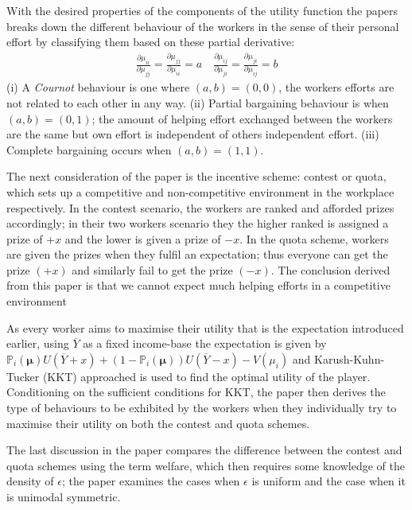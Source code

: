 \documentclass[a4paper,10pt,leqno]{article}
\theoremstyle{definition}
\begin{document}
With the desired properties of the components of the utility function the papers breaks down the different behaviour of the workers in the sense of their personal effort by classifying them based on these partial derivative:
\begin{align*}
\frac{\partial\mu_{ii}}{\partial\mu_{jj}}=\frac{\partial\mu_{jj}}{\partial\mu_{ii}}=a\quad
\frac{\partial\mu_{ij}}{\partial\mu_{ji}}=\frac{\partial\mu_{ji}}{\partial\mu_{ij}}=b
\end{align*}
(i) A \emph{Cournot} behaviour is one where $(a,b)=(0,0)$, the workers efforts are not related to each other in any way. (ii) Partial bargaining behaviour is when $(a,b)=(0,1)$; the amount of helping effort exchanged between the workers are the same but own effort is independent of others independent effort. (iii) Complete bargaining occurs when $(a,b)=(1,1)$.


The next consideration of the paper is the incentive scheme: contest or quota, which sets up a competitive and non-competitive environment in the workplace respectively. In the contest scenario, the workers are ranked and afforded prizes accordingly; in their two workers scenario they the higher ranked is assigned a prize of $+x$ and the lower is given a prize of $-x$. In the quota scheme, workers are given the prizes when they fulfil an expectation; thus everyone can get the prize $(+x)$ and similarly fail to get the prize $(-x)$. The conclusion derived from this paper is that we cannot expect much helping efforts in a competitive environment 

As every worker aims to maximise their utility that is the expectation introduced earlier, using $\overline{Y}$ as a fixed income-base the expectation is given by $\mathbb{P}_i(\mathbf{\mu})U(\overline{Y}+x)+(1-\mathbb{P}_i(\mathbf{\mu}))U(\overline{Y}-x)-V(\mu_i)$
and Karush-Kuhn-Tucker (KKT) approached is used to find the optimal utility of the player. Conditioning on the sufficient conditions for KKT, the paper then derives the type of behaviours to be exhibited by the workers when they individually try to maximise their utility on both the contest and quota schemes.

The last discussion in the paper compares the difference between the contest and quota schemes using the term welfare, which then requires some knowledge of the density of $\epsilon$; the paper examines the cases when $\epsilon$ is uniform and the case when it is unimodal symmetric.
\end{document}
